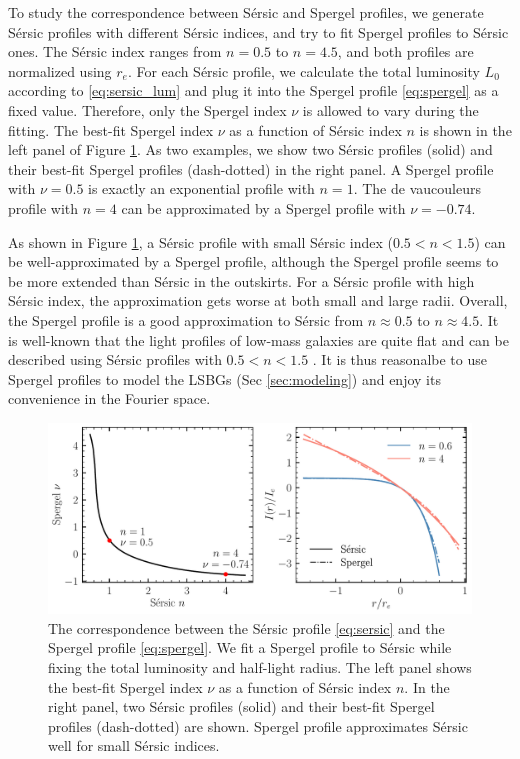 \documentclass[twocolumn,astrosymb,twocolappendix]{aastex631}
\newcommand{\sersic}{S\'ersic}
\begin{document}
\begin{CJK*}{UTF8}{gbsn}
To study the correspondence between \sersic{} and Spergel profiles, we generate \sersic{} profiles with different \sersic{} indices, and try to fit Spergel profiles to \sersic{} ones. The \sersic{} index ranges from $n=0.5$ to $n=4.5$, and both profiles are normalized using $r_e$. For each \sersic{} profile, we calculate the total luminosity $L_0$ according to \eqref{eq:sersic_lum} and plug it into the Spergel profile \eqref{eq:spergel} as a fixed value. Therefore, only the Spergel index $\nu$ is allowed to vary during the fitting. The best-fit Spergel index $\nu$ as a function of \sersic{} index $n$ is shown in the left panel of Figure \ref{fig:spgl_calib}. As two examples, we show two \sersic{} profiles (solid) and their best-fit Spergel profiles (dash-dotted) in the right panel. A Spergel profile with $\nu=0.5$ is exactly an exponential profile with $n=1$. The de vaucouleurs profile \citep{deVaucouleurs1948} with $n=4$ can be approximated by a Spergel profile with $\nu=-0.74$. 

As shown in Figure \ref{fig:spgl_calib}, a \sersic{} profile with small \sersic{} index ($0.5 < n < 1.5$) can be well-approximated by a Spergel profile, although the Spergel profile seems to be more extended than \sersic{} in the outskirts. For a \sersic{} profile with high \sersic{} index, the approximation gets worse at both small and large radii. Overall, the Spergel profile is a good approximation to \sersic{} from $n\approx 0.5$ to $n\approx 4.5$. It is well-known that the light profiles of low-mass galaxies are quite flat and can be described using \sersic{} profiles with $0.5 < n < 1.5$ \citep[e.g.,][]{Lange2015,Greco2018,ELVES-I}. It is thus reasonalbe to use Spergel profiles to model the LSBGs (Sec \ref{sec:modeling}) and enjoy its convenience in the Fourier space. 

\begin{figure}
	\vbox{ 
		\centering
		\includegraphics[width=0.75\linewidth]{spergel_sersic_calib.pdf}
	}
    \caption{The correspondence between the \sersic{} profile \eqref{eq:sersic} and the Spergel profile \eqref{eq:spergel}. We fit a Spergel profile to \sersic{} while fixing the total luminosity and half-light radius. The left panel shows the best-fit Spergel index $\nu$ as a function of \sersic{} index $n$. In the right panel, two \sersic{} profiles (solid) and their best-fit Spergel profiles (dash-dotted) are shown. Spergel profile approximates \sersic{} well for small \sersic{} indices.  
    }
    \label{fig:spgl_calib}
\end{figure}



\end{CJK*}
\end{document}
